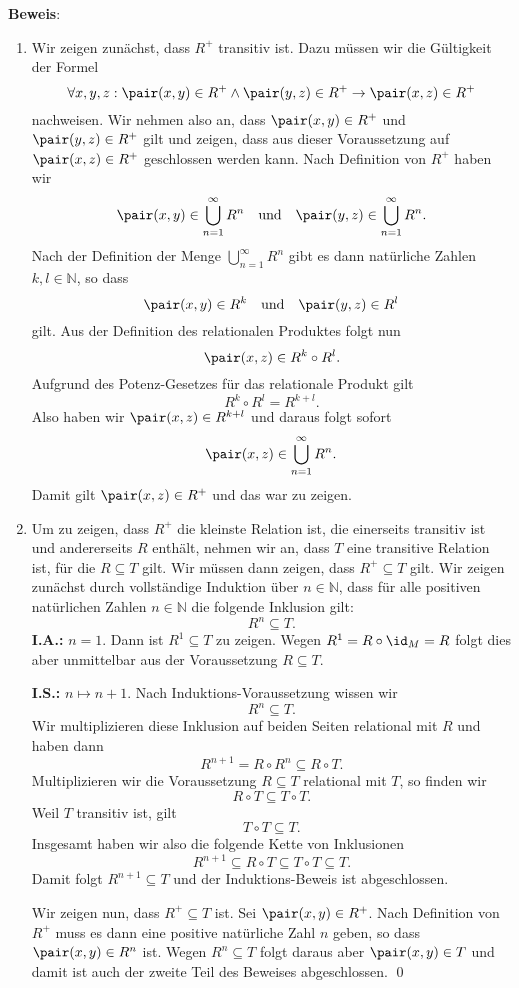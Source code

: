 \noindent
\textbf{Beweis}:
\begin{enumerate}
\item Wir zeigen zunächst, dass $R^+$ transitiv ist. Dazu müssen wir die Gültigkeit der Formel
      \[ \forall x, y, z: \pair(x,y) \in R^+ \wedge \pair(y,z) \in R^+ \rightarrow \pair(x,z) \in R^+ \]
nachweisen.  Wir nehmen also an, dass $\pair(x,y) \in R^+$ und $\pair(y,z) \in R^+$
gilt und zeigen, dass aus dieser Voraussetzung auf $\pair(x,z) \in R^+$ geschlossen
werden kann.  Nach Definition von $R^+$ haben wir 
\[ \pair(x,y) \in \bigcup\limits_{n=1}^{\infty} R^n \quad \mbox{und} \quad
   \pair(y,z) \in \bigcup\limits_{n=1}^{\infty} R^n.
\]
Nach der Definition der Menge $\bigcup\limits_{n=1}^{\infty} R^n$ gibt es dann natürliche Zahlen $k,l\in\mathbb{N}$, so dass
\[ \pair(x,y) \in R^k \quad \mbox{und} \quad \pair(y,z) \in R^l \]
gilt.  Aus der Definition des relationalen Produktes folgt nun
\[  \pair(x,z) \in R^k \circ R^l. \]
Aufgrund des Potenz-Gesetzes für das relationale Produkt gilt 
\[ R^k \circ R^l = R^{k+l}. \]
Also haben wir $\pair(x,z) \in R^{k+l}$ und daraus folgt sofort
\[  \pair(x,z) \in \bigcup\limits_{n=1}^{\infty} R^n. \]
Damit gilt $\pair(x,z) \in R^+$ und das war zu zeigen. 

\item 
Um zu zeigen, dass $R^+$ die kleinste Relation ist, die einerseits transitiv ist
und andererseits $R$ enthält, nehmen wir an, dass $T$ eine transitive Relation ist,
für die $R \subseteq T$ gilt.  Wir müssen dann zeigen, dass $R^+ \subseteq T$ gilt.
Wir zeigen zunächst durch vollständige Induktion über $n\in\mathbb{N}$, dass für alle positiven
natürlichen Zahlen $n\in\mathbb{N}$ die folgende Inklusion gilt:
\[ R^n \subseteq T. \]
\noindent
\textbf{I.A.:} $n=1$.  Dann ist $R^1 \subseteq T$ zu zeigen.  Wegen
 $R^1 = R \circ \id_M = R$
 folgt dies aber unmittelbar aus der Voraussetzung $R \subseteq T$.
\vspace*{0.1cm}

\noindent
\textbf{I.S.:} $n \mapsto n+1$.  Nach Induktions-Voraussetzung wissen wir
              \[ R^n \subseteq T. \]
             Wir multiplizieren diese Inklusion auf beiden Seiten relational mit $R$
             und haben dann
             \[ R^{n+1} = R \circ R^n \subseteq R \circ T. \]
             Multiplizieren wir die Voraussetzung $R \subseteq T$ relational mit
             $T$, so finden wir
             \[ R \circ T \subseteq T \circ T. \]
             Weil $T$ transitiv ist, gilt 
             \[ T \circ T \subseteq T. \]
             Insgesamt haben wir also die folgende Kette von Inklusionen
             \[ R^{n+1} \subseteq R \circ T \subseteq T \circ T \subseteq T. \]
             Damit folgt $R^{n+1} \subseteq T$ und der Induktions-Beweis ist
             abgeschlossen.
\vspace*{0.1cm}

\noindent
Wir zeigen nun, dass $R^+ \subseteq T$ ist.  Sei $\pair(x,y) \in R^+$.
Nach Definition von $R^+$ muss es dann eine positive natürliche Zahl $n$ geben, so
dass $\pair(x,y) \in R^n$ ist.  Wegen $R^n \subseteq T$ folgt daraus aber
$\pair(x,y) \in T$ und damit ist auch der zweite Teil des Beweises abgeschlossen. \qed
\end{enumerate}

